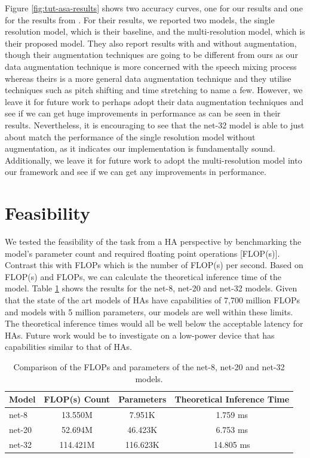 \documentclass[logo,bsc,singlespacing,parskip,online]{infthesis}
\begin{document}
Figure \ref{fig:tut-asa-results} shows two accuracy curves, one for our results 
and one for the results from \citet{schindler_multi-temporal_2018}. For their results, 
we reported two models, the single resolution model, which is their baseline, 
and the multi-resolution model, which is their proposed model. They also 
report results with and without augmentation, though their augmentation techniques 
are going to be different from ours as our data augmentation technique is more 
concerned with the speech mixing process whereas theirs is a more general 
data augmentation technique and they utilise techniques such as pitch shifting and 
time stretching to name a few. However, we leave it for future work 
to perhaps adopt their data augmentation techniques and see 
if we can get huge improvements in performance as can be seen in their results.
Nevertheless, it is encouraging to see 
that the net-32 model is able to just about match the performance of the single resolution model 
without augmentation, as it indicates our implementation is fundamentally sound. Additionally, we 
leave it for future work to adopt the multi-resolution model into our framework and see 
if we can get any improvements in performance.

\section{Feasibility} 
We tested the feasibility of the task from a HA perspective by benchmarking 
the model's parameter count and required floating point operations [FLOP(s)].
Contrast this with FLOPs which is the number of FLOP(s) per second. Based on 
FLOP(s) and FLOPs, we can calculate the theoretical inference time of the model.
Table \ref{tab:model-comparison} shows the results for the net-8, net-20 and net-32 models.
Given that the state of the art models of HAs have capabilities of 
7,700 million FLOPs and models with 5 million parameters, our models are well within these limits.
The theoretical inference times would all be well below the acceptable latency for HAs.
Future work would be to investigate on a low-power device that has capabilities 
similar to that of HAs. 

\begin{table}[h]
   \centering
   \begin{tabular}{lccc}
      \toprule
      Model & FLOP(s) Count & Parameters & Theoretical Inference Time\footnotemark \\
      \midrule
      net-8 & 13.550M & 7.951K & 1.759 ms \\ %
      net-20 & 52.694M & 46.423K & 6.753 ms \\ %
      net-32 & 114.421M & 116.623K & 14.805 ms \\ %
      \bottomrule
   \end{tabular}
   \caption{{Comparison of the FLOPs and parameters of the net-8, net-20 and net-32 models.}}
   \label{tab:model-comparison}
\end{table}
\end{document}
